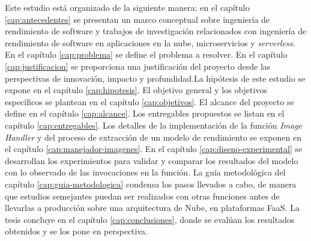 Este estudio está organizado de la siguiente manera: en el capítulo \ref{cap:antecedentes} se presentan un marco conceptual sobre ingeniería de rendimiento de software y trabajos de investigación relacionados con ingeniería de rendimiento de software en aplicaciones en la nube, microservicios y \emph{serverless}. En el capítulo \ref{cap:problema} se define el problema a resolver. En el capítulo \ref{cap:justificacion} se proporciona una justificación del proyecto desde las perspectivas de innovación, impacto y profundidad.La hipótesis de este estudio se expone en el capítulo \ref{cap:hipotesis}.  El objetivo general y los objetivos específicos se plantean en el capítulo \ref{cap:objetivos}. El alcance del proyecto se define en el capítulo \ref{cap:alcance}. Los entregables propuestos se listan en el capítulo \ref{cap:entregables}. Los detalles de la implementación de la función \emph{Image Handler} y del proceso de extracción de un modelo de rendimiento se exponen en el capítulo \ref{cap:manejador-imagenes}. En el capítulo \ref{cap:diseno-experimental} se desarrollan los experimientos para validar y comparar los resultados del modelo con lo observado de las invocaciones en la función. La guía metodológica del capítulo \ref{cap:guia-metodologica} condensa los pasos llevados a cabo, de manera que estudios semejantes puedan ser realizados con otras funciones antes de llevarlas a producción sobre una arquitectura de Nube, en plataformas FaaS. La tesis concluye en el capítulo \ref{cap:conclusiones}, donde se evalúan los resultados obtenidos y se los pone en perspectiva.



